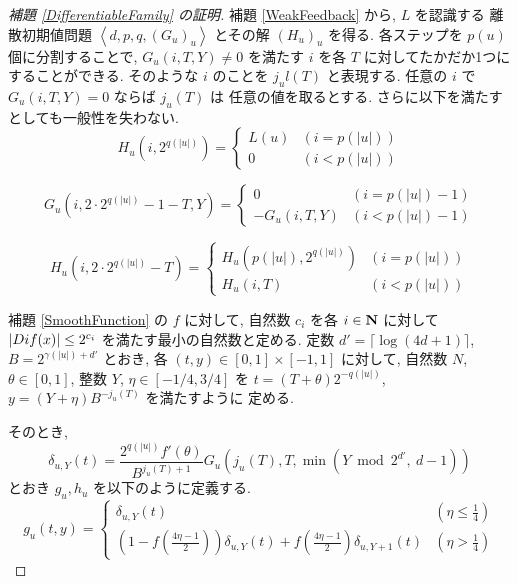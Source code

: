  \begin{proof}[\rm 補題 \ref{DifferentiableFamily} の証明]
  補題 \ref{WeakFeedback} から, $L$ を認識する 
  離散初期値問題 $\left< d, p, q,(G_u)_u \right>$
  とその解 $(H_u)_u$ を得る.
  各ステップを $p(u)$ 個に分割することで, $G_u(i, T, Y) \not = 0$ を満たす
  $i$ を各 $T$ に対してたかだか1つにすることができる. そのような $i$ のことを 
  $j_ul(T)$ と表現する. 任意の $i$ で $G_u(i, T, Y) = 0$ ならば $j_u(T)$ は
  任意の値を取るとする. 
  さらに以下を満たすとしても一般性を失わない.
  \begin{equation}
   H_u(i, 2^{q(|u|)}) = \begin{cases}
			 L(u) & (i=p(|u|)) \\
			0 & (i<p(|u|))
			\end{cases}
  \end{equation}

 \begin{equation}
  G_u(i, 2\cdot 2^{q(|u|)} - 1 - T, Y) 
   = \begin{cases}
      0 & (i=p(|u|)-1) \\
      -G_u(i,T,Y) & (i<p(|u|)-1)
     \end{cases}
 \end{equation}

 \begin{equation}
  H_u(i, 2 \cdot 2^{q(|u|)} - T) 
  = \begin{cases}
    H_u(p(|u|), 2^{q(|u|)}) & (i=p(|u|)) \\
    H_u(i, T) &  (i<p(|u|))
    \end{cases}
 \end{equation}

  補題 \ref{SmoothFunction} の $f$ に対して, 
 自然数 $c_i$ を各 $i \in \mathbf N$ に対して 
  $|D{i}f(x)| \le 2^{c_i}$ を満たす最小の自然数と定める.
 定数 $d' = \lceil \log (4d + 1) \rceil$, 
 $B = 2^{\gamma(|u|) + d'}$ とおき, 
 各 $(t, y) \in [0,1] \times [-1, 1]$ に対して,
 自然数 $N$, $\theta \in [0,1]$, 整数 $Y$, $\eta \in [-1/4, 3/4]$ を
 $t = (T + \theta)2^{-q(|u|)}$, $y = (Y + \eta)B^{-j_u(T)}$ を満たすように
 定める.
 
 そのとき,
 \begin{equation}
  \delta_{u, Y} (t) = \frac{2^{q(|u|)} f'(\theta)}{B^{j_u(T)+1}} 
   G_u\left( j_u(T), T, \min \left(Y \bmod 2^{d'}\!\!\!,\ d-1 \right) \right)
 \end{equation}
 とおき $g_u, h_u$ を以下のように定義する.
 \begin{equation}
  g_u(t,y) 
  = \begin{cases}
     \delta_{u, Y}(t)& (\eta \le \frac 1 4) \\
     ( 1-f ( \frac{4\eta-1}{2})) \delta_{u, Y}(t) 
     + f ( \frac{4\eta-1}{2}) \delta_{u,Y+1}(t)
     & (\eta > \frac 1 4)
    \end{cases}
  \label{eq:gu}
 \end{equation}


\end{proof}
